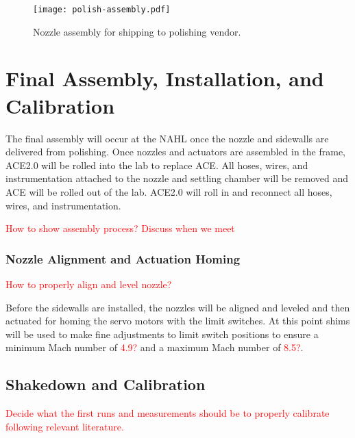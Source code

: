 \begin{figure}[ht!]
    \centering
    \texttt{[image: polish-assembly.pdf]}
    \caption{Nozzle assembly for shipping to polishing vendor.}
    \label{fig:polish-assembly}
\end{figure}

\section{Final Assembly, Installation, and Calibration}

The final assembly will occur at the NAHL once the nozzle and sidewalls are delivered from polishing. Once nozzles and actuators are assembled in the frame, ACE2.0 will be rolled into the lab to replace ACE. All hoses, wires, and instrumentation attached to the nozzle and settling chamber will be removed and ACE will be rolled out of the lab. ACE2.0 will roll in and reconnect all hoses, wires, and instrumentation.

\textcolor{red}{How to show assembly process? Discuss when we meet}

\subsubsection{Nozzle Alignment and Actuation Homing}

\textcolor{red}{How to properly align and level nozzle?}

Before the sidewalls are installed, the nozzles will be aligned and leveled and then actuated for homing the servo motors with the limit switches. At this point shims will be used to make fine adjustments to limit switch positions to ensure a minimum Mach number of \textcolor{red}{4.9?} and a maximum Mach number of \textcolor{red}{8.5?}.

\subsection{Shakedown and Calibration}

\textcolor{red}{Decide what the first runs and measurements should be to properly calibrate following relevant literature.}

